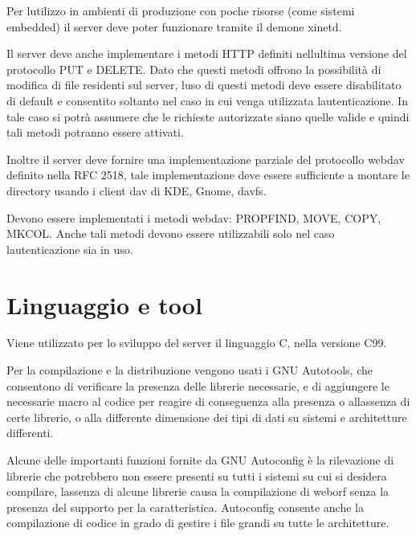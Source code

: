 \documentclass[a4paper,11pt]{article}
\begin{document}
{\sffamily
Per l{\textquotesingle}utilizzo in ambienti di produzione con poche
risorse (come sistemi embedded) il server deve poter funzionare tramite
il demone xinetd.}


\bigskip

{\sffamily
Il server deve anche implementare i metodi HTTP definiti
nell{\textquotesingle}ultima versione del protocollo PUT e DELETE. Dato
che questi metodi offrono la possibilit\`a di modifica di file
residenti sul server, l{\textquotesingle}uso di questi metodi deve
essere disabilitato di default e consentito soltanto nel caso in cui
venga utilizzata l{\textquotesingle}autenticazione. In tale caso si
potr\`a assumere che le richieste autorizzate siano quelle valide e
quindi tali metodi potranno essere attivati.}

{\sffamily
Inoltre il server deve fornire una implementazione parziale del
protocollo webdav definito nella RFC 2518, tale implementazione deve
essere sufficiente a montare le directory usando i client dav di KDE,
Gnome, davfs.}

{\sffamily
Devono essere implementati i metodi webdav: PROPFIND, MOVE, COPY, MKCOL.
Anche tali metodi devono essere utilizzabili solo nel caso
l{\textquotesingle}autenticazione sia in uso.}


\bigskip

\section{Linguaggio e tool}
{\sffamily
Viene utilizzato per lo sviluppo del server il linguaggio C, nella
versione C99.}

{\sffamily
Per la compilazione e la distribuzione vengono usati i GNU Autotools,
che consentono di verificare la presenza delle librerie necessarie, e
di aggiungere le necessarie macro al codice per reagire di conseguenza
alla presenza o all{\textquotesingle}assenza di certe librerie, o alla
differente dimensione dei tipi di dati su sistemi e architetture
differenti.}


\bigskip

{\sffamily
Alcune delle importanti funzioni fornite da GNU Autoconfig \`e la
rilevazione di librerie che potrebbero non essere presenti su tutti i
sistemi su cui si desidera compilare, l{\textquotesingle}assenza di
alcune librerie causa la compilazione di weborf senza la presenza del
supporto per la caratteristica\cite{GNU01}. Autoconfig consente anche la
compilazione di codice in grado di gestire i file grandi su tutte le
architetture.}
\end{document}
